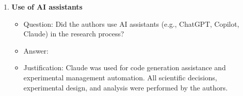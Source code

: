 \documentclass{article}
\begin{document}
\begin{enumerate}
\item {\bf Use of AI assistants}
    \begin{itemize}
        \item[] Question: Did the authors use AI assistants (e.g., ChatGPT, Copilot, Claude) in the research process?
        \item[] Answer: \answerYes{}
        \item[] Justification: Claude was used for code generation assistance and experimental management automation. All scientific decisions, experimental design, and analysis were performed by the authors.
    \end{itemize}

\end{enumerate}

\newpage
\appendix










\end{document}
